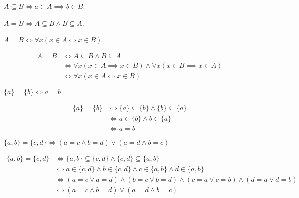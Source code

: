 \begin{definicija}
    $A \subseteq B \iff a \in A \implies b \in B$.
\end{definicija}

\begin{definicija}
    $A = B \iff A \subseteq B \wedge B \subseteq A$.
\end{definicija}

\begin{trditev}
    $A = B \iff \forall x (x \in A \iff x \in B)$.
\end{trditev}
\begin{dokaz}
\begin{align*}
    A = B &\iff A \subseteq B \wedge B \subseteq A \\
    &\iff \forall x (x \in A \implies x \in B) \wedge \forall x (x \in B \implies x \in A) \\
    &\iff \forall x (x \in A \iff x \in B)
\end{align*}
\end{dokaz}

\begin{trditev}
    $\{a\} = \{b\} \iff a = b$
\end{trditev}
\begin{dokaz}
\begin{align*}
    \{a\} = \{b\} &\iff \{a\} \subseteq \{b\} \wedge \{b\} \subseteq \{a\} \\
    &\iff a \in \{b\} \wedge b \in \{a\} \\
    &\iff a = b
\end{align*}
\end{dokaz}

\begin{trditev}
    $\{a, b\} = \{c, d\} \iff (a = c \wedge b = d) \vee (a = d \wedge b = c)$
\end{trditev}
\begin{dokaz}
\begin{align*}
    \{a, b\} = \{c, d\} &\iff \{a, b\} \subseteq \{c, d\} \wedge \{c, d\} \subseteq \{a, b\} \\
    &\iff a \in \{c, d\} \wedge b \in \{c, d\} \wedge c \in \{a, b\} \wedge d \in \{a, b\} \\
    &\iff (a = c \vee a = d) \wedge (b = c \vee b = d) \wedge (c = a \vee c = b) \wedge (d = a \vee d = b) \\
    &\iff (a = c \wedge b = d) \vee (a = d \wedge b = c)
\end{align*}
\end{dokaz}

